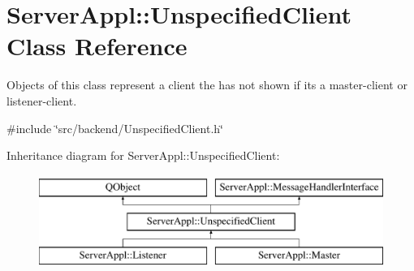 \hypertarget{class_server_appl_1_1_unspecified_client}{}\section{Server\+Appl\+:\+:Unspecified\+Client Class Reference}
\label{class_server_appl_1_1_unspecified_client}


Objects of this class represent a client the has not shown if its a master-\/client or listener-\/client.  




{\ttfamily \#include \char`\"{}src/backend/\+Unspecified\+Client.\+h\char`\"{}}

Inheritance diagram for Server\+Appl\+:\+:Unspecified\+Client\+:\begin{figure}[H]
\begin{center}
\leavevmode
\includegraphics[height=3.000000cm]{class_server_appl_1_1_unspecified_client}
\end{center}
\end{figure}
